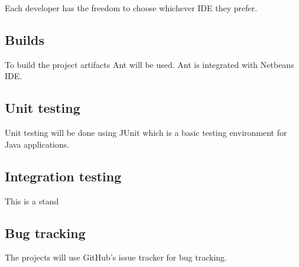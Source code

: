 Each developer has the freedom to choose whichever IDE they prefer. 

\subsection{Builds}

To build the project artifacts Ant will be used. Ant is integrated with Netbeans IDE.

\subsection{Unit testing}

Unit testing will be done using JUnit which is a basic testing environment for Java applications.

\subsection{Integration testing}

This is a stand
\subsection{Bug tracking}

The projects will use GitHub's issue tracker for bug tracking.





	

